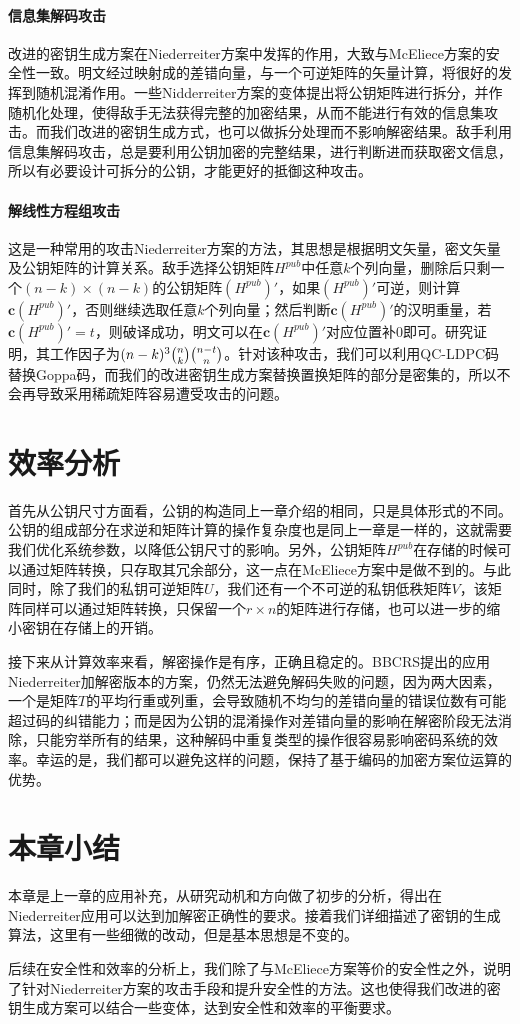 \paragraph{信息集解码攻击}
改进的密钥生成方案在Niederreiter方案中发挥的作用，大致与McEliece方案的安全性一致。明文经过映射成的差错向量，与一个可逆矩阵的矢量计算，将很好的发挥到随机混淆作用。一些Nidderreiter方案的变体提出将公钥矩阵进行拆分，并作随机化处理，使得敌手无法获得完整的加密结果，从而不能进行有效的信息集攻击。而我们改进的密钥生成方式，也可以做拆分处理而不影响解密结果。敌手利用信息集解码攻击，总是要利用公钥加密的完整结果，进行判断进而获取密文信息，所以有必要设计可拆分的公钥，才能更好的抵御这种攻击。

\paragraph{解线性方程组攻击}
这是一种常用的攻击Niederreiter方案的方法，其思想是根据明文矢量，密文矢量及公钥矩阵的计算关系。敌手选择公钥矩阵$H^{pub}$中任意$k$个列向量，删除后只剩一个$(n - k) \times (n - k)$的公钥矩阵$(H^{pub})'$，如果$(H^{pub})'$可逆，则计算$\mathbf{c}(H^{pub})'$，否则继续选取任意$k$个列向量；然后判断$\mathbf{c}(H^{pub})'$的汉明重量，若$\mathbf{c}(H^{pub})' = t$，则破译成功，明文可以在$\mathbf{c}(H^{pub})'$对应位置补$0$即可。研究证明，其工作因子为$(n - k) ^ 3 \tbinom{n}{k} \tbinom{n - t}{n}$。针对该种攻击，我们可以利用QC-LDPC码替换Goppa码，而我们的改进密钥生成方案替换置换矩阵的部分是密集的，所以不会再导致采用稀疏矩阵容易遭受攻击的问题。

\section{效率分析}
首先从公钥尺寸方面看，公钥的构造同上一章介绍的相同，只是具体形式的不同。公钥的组成部分在求逆和矩阵计算的操作复杂度也是同上一章是一样的，这就需要我们优化系统参数，以降低公钥尺寸的影响。另外，公钥矩阵$H^{pub}$在存储的时候可以通过矩阵转换，只存取其冗余部分，这一点在McEliece方案中是做不到的。与此同时，除了我们的私钥可逆矩阵$U$，我们还有一个不可逆的私钥低秩矩阵$V$，该矩阵同样可以通过矩阵转换，只保留一个$r \times n$的矩阵进行存储，也可以进一步的缩小密钥在存储上的开销。

接下来从计算效率来看，解密操作是有序，正确且稳定的。BBCRS提出的应用Niederreiter加解密版本的方案，仍然无法避免解码失败的问题，因为两大因素，一个是矩阵$T$的平均行重或列重，会导致随机不均匀的差错向量的错误位数有可能超过码的纠错能力；而是因为公钥的混淆操作对差错向量的影响在解密阶段无法消除，只能穷举所有的结果，这种解码中重复类型的操作很容易影响密码系统的效率。幸运的是，我们都可以避免这样的问题，保持了基于编码的加密方案位运算的优势。

\section{本章小结}
本章是上一章的应用补充，从研究动机和方向做了初步的分析，得出在Niederreiter应用可以达到加解密正确性的要求。接着我们详细描述了密钥的生成算法，这里有一些细微的改动，但是基本思想是不变的。

后续在安全性和效率的分析上，我们除了与McEliece方案等价的安全性之外，说明了针对Niederreiter方案的攻击手段和提升安全性的方法。这也使得我们改进的密钥生成方案可以结合一些变体，达到安全性和效率的平衡要求。
